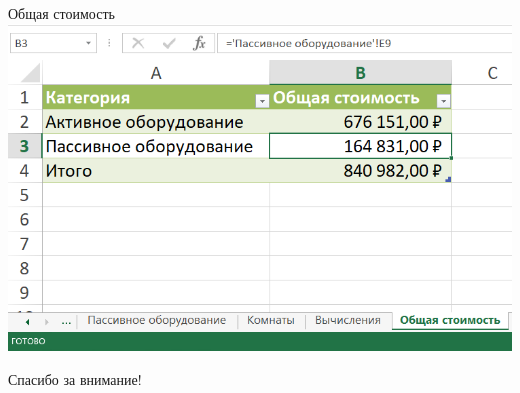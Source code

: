 \documentclass[aspectratio=169]{beamer}
\begin{document}
\begin{frame}{Общая стоимость}
	\centering
	\includegraphics[width=0.8\linewidth]{images/Общая сумма.png}
\end{frame}

\begin{frame}
	\begin{center}
		\huge Спасибо за внимание!
	\end{center}
\end{frame}
\end{document}
